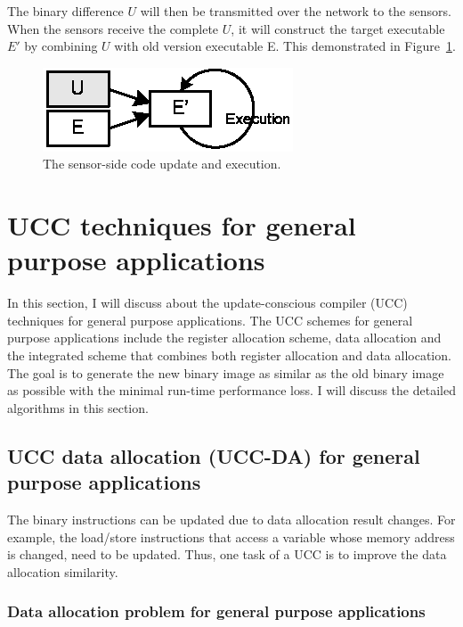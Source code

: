 The binary difference $U$ will then be transmitted over the network to the sensors. When the sensors receive the 
complete $U$, it will construct the target executable $E'$ by combining $U$ with old version executable {E}. This 
demonstrated in Figure~\ref{fover.sensor}.

\begin{figure}[htp]
\centering
\includegraphics[scale=1]{figures/com_sensor.eps}
\caption{The sensor-side code update and execution.}
\label{fover.sensor}
\end{figure}

\section{UCC techniques for general purpose applications}

In this section, I will discuss about the update-conscious compiler (UCC) techniques for general purpose applications.
The UCC schemes for general purpose applications include the register allocation scheme, data allocation and
the integrated scheme that combines both register allocation and data allocation.
The goal is to generate the new binary image as similar as the old binary image as possible with the minimal
run-time performance loss. I will discuss the detailed algorithms in this section.


\subsection{UCC data allocation (UCC-DA) for general purpose applications} 

The binary instructions can be updated due to data allocation result changes.
For example, the load/store instructions that access a variable whose memory address is changed,
need to be updated.
Thus, one task of a UCC is to improve the data allocation similarity.


\subsubsection{Data allocation problem for general purpose applications}

